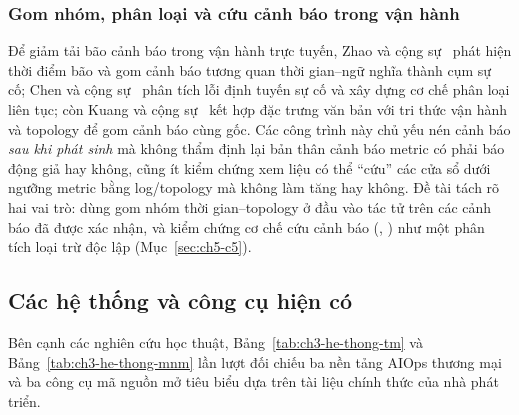 \subsubsection{Gom nhóm, phân loại và cứu cảnh báo trong vận hành}
\label{sec:ch3-alert-triage}

Để giảm tải bão cảnh báo trong vận hành trực tuyến, Zhao và cộng sự~\cite{zhao2020alertstorm} phát hiện thời điểm bão và gom cảnh báo tương quan thời gian--ngữ nghĩa thành cụm sự cố; Chen và cộng sự~\cite{chen2019empirical,chen2019continuous} phân tích lỗi định tuyến sự cố và xây dựng cơ chế phân loại liên tục; còn Kuang và cộng sự~\cite{kuang2024knowledge} kết hợp đặc trưng văn bản với tri thức vận hành và topology để gom cảnh báo cùng gốc. Các công trình này chủ yếu nén cảnh báo \emph{sau khi phát sinh} mà không thẩm định lại bản thân cảnh báo metric có phải báo động giả hay không, cũng ít kiểm chứng xem liệu có thể ``cứu'' các cửa sổ dưới ngưỡng metric bằng log/topology mà không làm tăng  hay không. Đề tài tách rõ hai vai trò: dùng gom nhóm thời gian--topology ở đầu vào tác tử  trên các cảnh báo đã được \CTAV{} xác nhận, và kiểm chứng cơ chế cứu cảnh báo (, ) như một phân tích loại trừ độc lập (Mục~\ref{sec:ch5-c5}).

\subsection{Các hệ thống và công cụ hiện có}
\label{sec:ch3-he-thong}
\label{sec:ch3-thuong-mai}
\label{sec:ch3-ma-nguon-mo}

Bên cạnh các nghiên cứu học thuật, Bảng~\ref{tab:ch3-he-thong-tm} và Bảng~\ref{tab:ch3-he-thong-mnm} lần lượt đối chiếu ba nền tảng AIOps thương mại và ba công cụ mã nguồn mở tiêu biểu dựa trên tài liệu chính thức của nhà phát triển.

